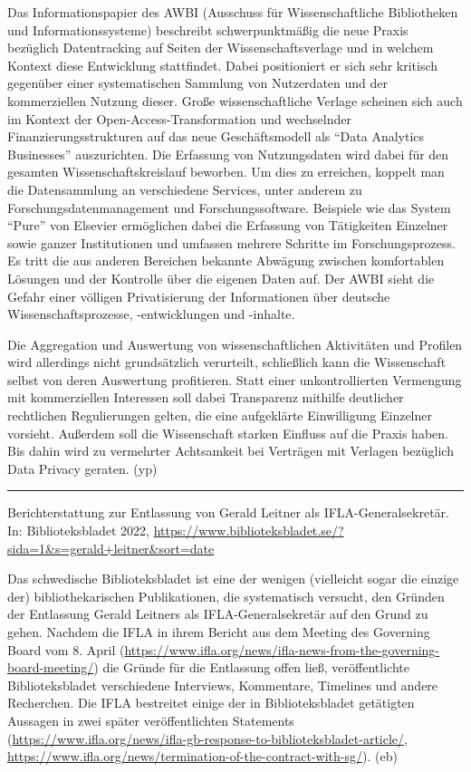 \documentclass[a4paper,
fontsize=11pt,
oneside,
numbers=noperiodatend,
parskip=half-,
bibliography=totoc,
final
]{scrartcl}
\begin{document}
Das Informationspapier des AWBI (Ausschuss für Wissenschaftliche
Bibliotheken und Informationssysteme) beschreibt schwerpunktmäßig die
neue Praxis bezüglich Datentracking auf Seiten der Wissenschaftsverlage
und in welchem Kontext diese Entwicklung stattfindet. Dabei positioniert
er sich sehr kritisch gegenüber einer systematischen Sammlung von
Nutzerdaten und der kommerziellen Nutzung dieser. Große
wissenschaftliche Verlage scheinen sich auch im Kontext der
Open-Access-Transformation und wechselnder Finanzierungsstrukturen auf
das neue Geschäftsmodell als \enquote{Data Analytics Businesses}
auszurichten. Die Erfassung von Nutzungsdaten wird dabei für den
gesamten Wissenschaftskreislauf beworben. Um dies zu erreichen, koppelt
man die Datensammlung an verschiedene Services, unter anderem zu
Forschungsdatenmanagement und Forschungssoftware. Beispiele wie das
System \enquote{Pure} von Elsevier ermöglichen dabei die Erfassung von
Tätigkeiten Einzelner sowie ganzer Institutionen und umfassen mehrere
Schritte im Forschungsprozess. Es tritt die aus anderen Bereichen
bekannte Abwägung zwischen komfortablen Lösungen und der Kontrolle über
die eigenen Daten auf. Der AWBI sieht die Gefahr einer völligen
Privatisierung der Informationen über deutsche Wissenschaftsprozesse,
-entwicklungen und -inhalte.

Die Aggregation und Auswertung von wissenschaftlichen Aktivitäten und
Profilen wird allerdings nicht grundsätzlich verurteilt, schließlich
kann die Wissenschaft selbst von deren Auswertung profitieren. Statt
einer unkontrollierten Vermengung mit kommerziellen Interessen soll
dabei Transparenz mithilfe deutlicher rechtlichen Regulierungen gelten,
die eine aufgeklärte Einwilligung Einzelner vorsieht. Außerdem soll die
Wissenschaft starken Einfluss auf die Praxis haben. Bis dahin wird zu
vermehrter Achtsamkeit bei Verträgen mit Verlagen bezüglich Data Privacy
geraten. (yp)

\begin{center}\rule{0.5\linewidth}{0.5pt}\end{center}

Berichterstattung zur Entlassung von Gerald Leitner als
IFLA-Generalsekretär. In: Biblioteksbladet 2022,
\url{https://www.biblioteksbladet.se/?sida=1\&s=gerald+leitner\&sort=date}

Das schwedische Biblioteksbladet ist eine der wenigen (vielleicht sogar
die einzige der) bibliothekarischen Publikationen, die systematisch
versucht, den Gründen der Entlassung Gerald Leitners als
IFLA-Generalsekretär auf den Grund zu gehen. Nachdem die IFLA in ihrem
Bericht aus dem Meeting des Governing Board vom 8. April
(\url{https://www.ifla.org/news/ifla-news-from-the-governing-board-meeting/})
die Gründe für die Entlassung offen ließ, veröffentlichte
Biblioteksbladet verschiedene Interviews, Kommentare, Timelines und
andere Recherchen. Die IFLA bestreitet einige der in Biblioteksbladet
getätigten Aussagen in zwei später veröffentlichten Statements
(\url{https://www.ifla.org/news/ifla-gb-response-to-biblioteksbladet-article/},
\url{https://www.ifla.org/news/termination-of-the-contract-with-sg/}).
(eb)
\end{document}
